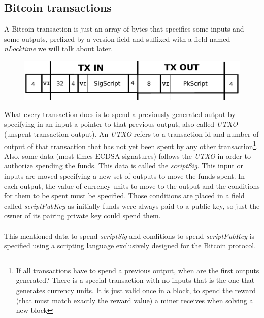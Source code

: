 \documentclass[12pt,journal,compsoc]{IEEEtran}
\begin{document}
\subsection{Bitcoin transactions}
A Bitcoin transaction is just an array of bytes that specifies some inputs and some outputs, prefixed by a version field and suffixed with a field named \textit{nLocktime} we will talk about later.
\begin{figure}[h]
    \includegraphics[width=\linewidth]{img/tx_format.png}
\end{figure}
What every transaction does is to spend a previously generated output by specifying in an input a pointer to that previous output, also called \textit{UTXO} (unspent transaction output). An \textit{UTXO} refers to a transaction id and number of output of that transaction that has not yet been spent by any other transaction\footnote{If all transactions have to spend a previous output, when are the first outputs generated? There is a special transaction with no inputs that is the one that generates currency units. It is just valid once in a block, to spend the reward (that must match exactly the reward value) a miner receives when solving a new block}. Also, some data (most times ECDSA signatures) follows the \textit{UTXO} in order to authorize spending the funds. This data is called the \textit{scriptSig}. This input or inputs are moved specifying a new set of outputs to move the funds spent. In each output, the value of currency units to move to the output and the conditions for them to be spent must be specified. Those conditions are placed in a field called \textit{scriptPubKey} as initially funds were always paid to a public key, so just the owner of its pairing private key could spend them. \\\\
This mentioned data to spend \textit{scriptSig} and conditions to spend \textit{scriptPubKey} is specified using a scripting language exclusively designed for the Bitcoin protocol\cite{bitcoin-wiki-script:online}.
\end{document}

